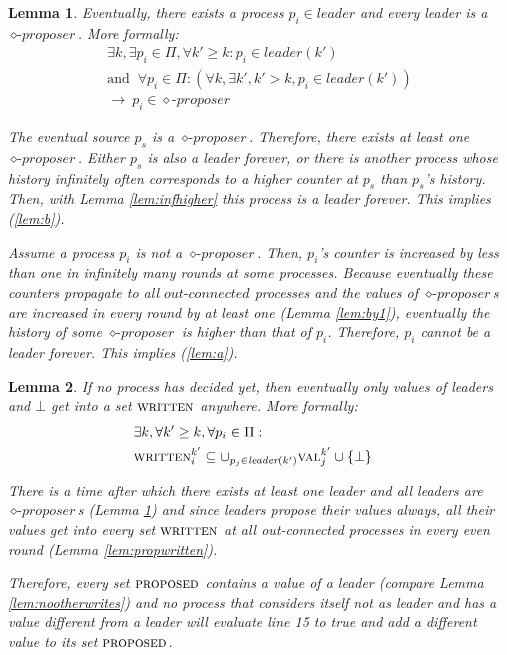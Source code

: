 \documentclass[conference, compsoc]{IEEEtran}
\newtheorem{lemma}{Lemma}
\def\val{\textsc{val}}
\def\proposed{\textsc{proposed}}
\def\written{\textsc{written}}
\def\proposer{\diamond\textit{-proposer}}
\def\out{\textit{out-connected}}
\def\leader{\textit{leader}}
\begin{document}
\begin{lemma} \label{lem:propmaximal}
Eventually, there exists a process $p_i \in \leader$ and every leader is a $\proposer$. More formally:
 \begin{eqnarray}
  \exists k, \exists p_i \in \Pi, \forall k' \ge k: p_i \in \leader(k') \label{lem:b} \\
  \textrm{and } \  \forall p_i \in \Pi: (\forall k, \exists k', k' > k, p_i \in \leader(k'))  \nonumber \\  
 \rightarrow \ p_i \in \proposer \label{lem:a}
 \end{eqnarray}
\begin{IEEEproof}
The eventual source $p_s$ is a $\proposer$. Therefore, there exists at least one $\proposer$. Either $p_s$ is also a leader forever, or there is another process whose history infinitely often corresponds to a higher counter at $p_s$ than $p_s$'s history. Then, with Lemma \ref{lem:infhigher} this process is a leader forever. This implies (\ref{lem:b}).


Assume a process $p_i$ is not a $\proposer$. Then, $p_i$'s counter is increased by less than one in infinitely many rounds at some processes. Because eventually these counters propagate to all $\out$  processes and the values of $\proposer$s are increased in every round by at least one (Lemma \ref{lem:by1}), eventually the history of some $\proposer$ is higher than that of $p_i$. Therefore, $p_i$ cannot be a leader forever. This implies (\ref{lem:a}).  

 
\end{IEEEproof}
\end{lemma}




\begin{lemma} \label{lem:nodifferent}
If no process has decided yet, then eventually only values of leaders and $\bot$ get into a set $\written$ anywhere. More formally:
\begin{eqnarray*}
 &\exists k, \forall k' \ge k, \forall p_i \in \Pi: & \\
 & \written_{i}^{k'} \subseteq \cup_{p_j \in \leader(k')} \val_{j}^{k'} \cup \{\bot\} &
\end{eqnarray*}
 \begin{IEEEproof}
 There is a time after which there exists at least one leader and all leaders are $\proposer$s (Lemma \ref{lem:propmaximal}) and since leaders propose their values always, all their values get into every set $\written$ at all out-connected processes in every even round (Lemma \ref{lem:propwritten}).
 
 Therefore, every set $\proposed$ contains a value of a leader (compare Lemma \ref{lem:nootherwrites}) and no process that considers itself not as leader and has a value different from a leader will evaluate line 15 to true and add a different value to its set $\proposed$.
 \end{IEEEproof} 
\end{lemma}
\end{document}
